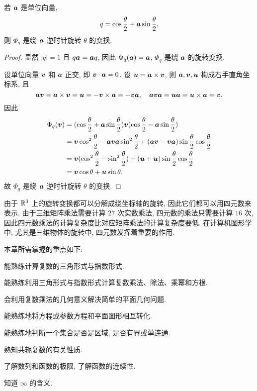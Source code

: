 \begin{theorem}
  若 ${\boldsymbol{a}}$ 是单位向量,
  \[
    q=\cos\frac\theta2+{\boldsymbol{a}}\sin\frac\theta2,
  \]
  则 $\Phi_q$ 是绕 ${\boldsymbol{a}}$ 逆时针旋转 $\theta$ 的变换.
\end{theorem}

\begin{proof}
  显然 $|q|=1$ 且 $q{\boldsymbol{a}}={\boldsymbol{a}} q$, 因此 $\Phi_q({\boldsymbol{a}})={\boldsymbol{a}}$, $\Phi_q$ 是绕 ${\boldsymbol{a}}$ 的旋转变换.

  设单位向量 ${\boldsymbol{v}}$ 和 ${\boldsymbol{a}}$ 正交, 即 ${\boldsymbol{v}}\cdot {\boldsymbol{a}}=0$.
  设 ${\boldsymbol{u}}={\boldsymbol{a}}\times{\boldsymbol{v}}$, 则 ${\boldsymbol{a}},{\boldsymbol{v}},{\boldsymbol{u}}$ 构成右手直角坐标系, 且
  \[
    {\boldsymbol{a}}{\boldsymbol{v}}={\boldsymbol{a}}\times{\boldsymbol{v}}={\boldsymbol{u}}=-{\boldsymbol{v}}\times{\boldsymbol{a}}=-{\boldsymbol{v}}{\boldsymbol{a}},\quad
    {\boldsymbol{a}}{\boldsymbol{v}}{\boldsymbol{a}}={\boldsymbol{u}}{\boldsymbol{a}}={\boldsymbol{u}}\times{\boldsymbol{a}}={\boldsymbol{v}}.
  \]
  因此
  \begin{align*}
    \Phi_q({\boldsymbol{v}})&
    =(\cos\frac\theta2+{\boldsymbol{a}}\sin\frac\theta2){\boldsymbol{v}} 
      (\cos\frac\theta2-{\boldsymbol{a}}\sin\frac\theta2)\\&
    ={\boldsymbol{v}}\cos^2\frac\theta2-{\boldsymbol{a}}{\boldsymbol{v}}{\boldsymbol{a}}\sin^2\frac\theta2
      +({\boldsymbol{a}}{\boldsymbol{v}}-{\boldsymbol{v}}{\boldsymbol{a}})\sin\frac\theta2\cos\frac\theta2\\&
    ={\boldsymbol{v}}(\cos^2\frac\theta2-\sin^2\frac\theta2)
      +({\boldsymbol{u}}+{\boldsymbol{u}})\sin\frac\theta2\cos\frac\theta2\\&
    ={\boldsymbol{v}}\cos\theta+{\boldsymbol{u}}\sin\theta.
  \end{align*}
  故 $\Phi_q$ 是绕 ${\boldsymbol{a}}$ 逆时针旋转 $\theta$ 的变换.
\end{proof}

由于 ${\mathbb{R}}^3$ 上的旋转变换都可以分解成绕坐标轴的旋转, 因此它们都可以用四元数来表示.
由于三维矩阵乘法需要计算 $27$ 次实数乘法, 四元数的乘法只需要计算 $16$ 次, 因此四元数乘法的计算复杂度比对应矩阵乘法的计算复杂度要低.
在计算机图形学中, 尤其是三维物体的旋转中, 四元数发挥着重要的作用.



本章所需掌握的重点如下:
\begin{enuma}
  \item 能熟练计算复数的三角形式与指数形式.
  \item 能熟练利用三角形式与指数形式计算复数乘法、除法、乘幂和方根.
  \item 会利用复数乘法的几何意义解决简单的平面几何问题.
  \item 能熟练地将方程或参数方程和平面图形相互转化.
  \item 能熟练地判断一个集合是否是区域, 是否有界或单连通.
  \item 熟知共轭复数的有关性质.
  \item 了解数列和函数的极限, 了解函数的连续性. 
  \item 知道 $\infty$ 的含义.
\end{enuma}

